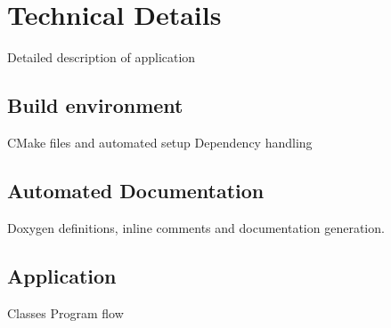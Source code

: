 \appendix
\appendixpage
\addappheadtotoc

\section{Technical Details}\label{sec:details}
Detailed description of application

\subsection{Build environment}

CMake files and automated setup
Dependency handling

\subsection{Automated Documentation}

Doxygen definitions, inline comments and documentation generation.

\subsection{Application}

Classes
Program flow